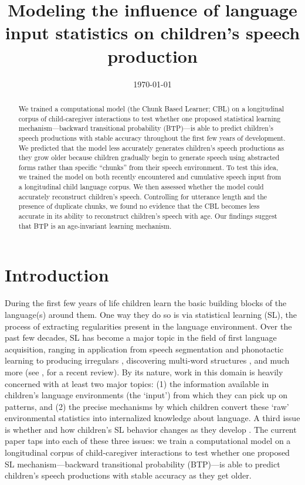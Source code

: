 \documentclass{article}
\title{Modeling the influence of language input statistics on children's speech production}
\date{\today}
\begin{document}
\maketitle

\begin{abstract}
 We trained a computational model (the Chunk Based Learner; CBL) on a longitudinal corpus of child-caregiver interactions to test whether one proposed statistical learning mechanism---backward transitional probability (BTP)---is able to predict children's speech productions with stable accuracy throughout the first few years of development. We predicted that the model less accurately generates children's speech productions as they grow older because children gradually begin to generate speech using abstracted forms rather than specific ``chunks'' from their speech environment. To test this idea, we trained the model on both recently encountered and cumulative speech input from a longitudinal child language corpus. We then assessed whether the model could accurately reconstruct children's speech. Controlling for utterance length and the presence of duplicate chunks, we found no evidence that the CBL becomes less accurate in its ability to reconstruct children's speech with age. Our findings suggest that BTP is an age-invariant learning mechanism.
\end{abstract}


\section{Introduction}

During the first few years of life children learn the basic building blocks of the language(s) around them. One way they do so is via statistical learning (SL), the process of extracting  regularities present in the language environment. Over the past few decades, SL has become a major topic in the field of first language acquisition, ranging in application from speech segmentation \cite{jusczyk1995infants, saffran1996statistical} and phonotactic learning \cite{chambers2003infants} to producing irregulars \cite{arnon2011brush}, discovering multi-word structures \cite{bannard2009modeling, chang2006using, frost2019}, and much more (see , for a recent review). By its nature, work in this domain is heavily concerned with at least two major topics: (1) the information available in children's language environments (the `input') from which they can pick up on patterns, and (2) the precise mechanisms by which children convert these `raw' environmental statistics into internalized knowledge about language. A third issue is whether and how children's SL behavior changes as they develop \cite{shufaniya2018statistical}. The current paper taps into each of these three issues: we train a computational model on a longitudinal corpus of child-caregiver interactions to test whether one proposed SL mechanism---backward transitional probability (BTP)---is able to predict children's speech productions with stable accuracy as they get older.
\end{document}
